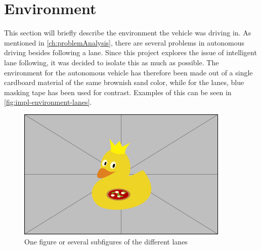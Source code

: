 \section{Environment}\label{sec:impl-environment}
This section will briefly describe the environment the vehicle was driving in. As mentioned in \autoref{ch:problemAnalysis}, there are several problems in autonomous driving besides following a lane. Since this project explores the issue of intelligent lane following, it was decided to isolate this as much as possible. The environment for the autonomous vehicle has therefore been made out of a single cardboard material of the same brownish sand color, while for the lanes, blue masking tape has been used for contrast. Examples of this can be seen in \autoref{fig:impl-environment-lanes}.

\begin{figure}[H]
    \centering
    \includegraphics[width=\textwidth]{images/example-image-duck}
    \caption{One figure or several subfigures of the different lanes}
    \label{fig:impl-environment-lanes}
\end{figure}

